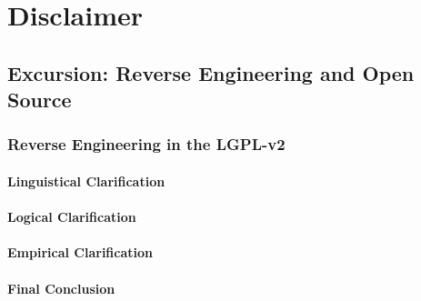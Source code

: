 \documentclass[DIV=calc,BCOR=5mm,12pt,headings=small,oneside,toc=bib]{scrbook}
\begin{document}
\footnotesize
\tableofcontents
\newpage




\normalsize

\chapter*{Disclaimer}



%










\section{Excursion: Reverse Engineering and Open Source}

\subsection{Reverse Engineering in the LGPL-v2}

\subsubsection{Linguistical Clarification}

\subsubsection{Logical Clarification}

\subsubsection{Empirical Clarification}

\subsubsection{Final Conclusion}

\end{document}
